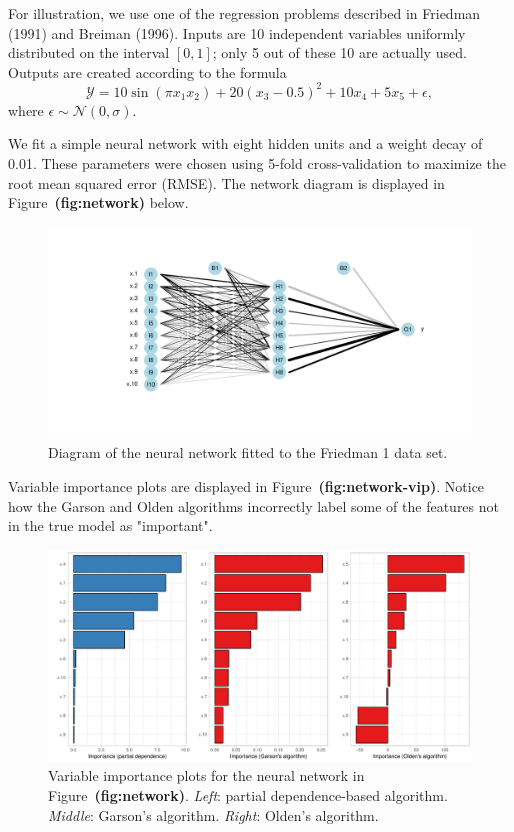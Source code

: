 \documentclass{article}
\def\ref#1{\textbf{(#1)}}
\begin{document}
For illustration, we use one of the regression problems described in Friedman (1991) and Breiman (1996). Inputs are 10 independent variables uniformly distributed on the interval $\left[0, 1\right]$; only 5 out of these 10 are actually used. Outputs are created according to the formula
\begin{equation}
\mathcal{Y} = 10 \sin\left(\pi x_1 x_2\right) + 20 \left(x_3 - 0.5\right) ^ 2 + 10 x_4 + 5 x_5 + \epsilon,
\end{equation}
where $\epsilon \sim \mathcal{N}\left(0, \sigma\right)$.


We fit a simple neural network with eight hidden units and a weight decay of 0.01. These parameters were chosen using 5-fold cross-validation to maximize the root mean squared error (RMSE). The network diagram is displayed in Figure~\ref{fig:network} below.
\begin{figure}[!htb]
  \label{network}
  \centering
  \includegraphics[width=1.0\textwidth]{network}
  \caption{Diagram of the neural network fitted to the Friedman 1 data set.}
\end{figure}

Variable importance plots are displayed in Figure~\ref{fig:network-vip}. Notice how the Garson and Olden algorithms incorrectly label some of the features not in the true model as "important".
\begin{figure}[!htb]
  \label{network-vip}
  \centering
  \includegraphics[width=1.0\textwidth]{network-vip}
  \caption{Variable importance plots for the neural network in Figure~\ref{fig:network}. \textit{Left}: partial dependence-based algorithm. \textit{Middle}: Garson's algorithm. \textit{Right}: Olden's algorithm.}
\end{figure}
\end{document}
